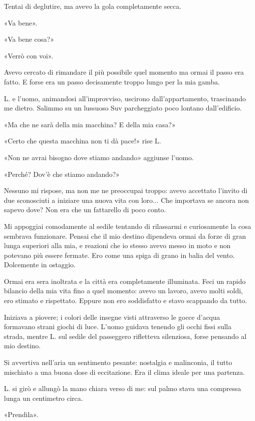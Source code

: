 \documentclass[a4paper,12pt]{book}
\begin{document}
Tentai di deglutire, ma avevo la gola completamente secca.

«Va bene».

«Va bene cosa?»

«Verrò con voi».

Avevo cercato di rimandare il più possibile quel momento ma ormai il passo era
fatto. E forse era un passo decisamente troppo lungo per la mia gamba.

L. e l'uomo, animandosi all'improvviso, uscirono dall'appartamento,
trascinando me dietro. Salimmo su un lussuoso Suv parcheggiato poco lontano
dall'edificio.

«Ma che ne sarà della mia macchina? E della mia casa?»

«Certo che questa macchina non ti dà pace!» rise L.

«Non ne avrai bisogno dove stiamo andando» aggiunse l'uomo.

«Perché? Dov'è che stiamo andando?»

Nessuno mi rispose, ma non me ne preoccupai troppo: avevo accettato l'invito
di due sconosciuti a iniziare una nuova vita con loro... Che importava se ancora
non sapevo dove? Non era che un fattarello di poco conto.

Mi appoggiai comodamente al sedile tentando di rilassarmi e curiosamente la
cosa sembrava funzionare. Pensai che il mio destino dipendeva ormai da forze di
gran lunga superiori alla mia, e reazioni che io stesso avevo messo in moto e
non potevano più essere fermate. Ero come una spiga di grano in balia del
vento. Dolcemente in ostaggio.

Ormai era sera inoltrata e la città era completamente illuminata. Feci un
rapido bilancio della mia vita fino a quel momento: avevo un lavoro, avevo molti
soldi, ero stimato e rispettato. Eppure non ero soddisfatto e stavo scappando
da tutto.

Iniziava a piovere; i colori delle insegne visti attraverso le gocce d'acqua
formavano strani giochi di luce. L'uomo guidava tenendo gli occhi fissi sulla
strada, mentre L. sul sedile del passeggero rifletteva silenziosa, forse
pensando al mio destino.

Si avvertiva nell'aria un sentimento pesante: nostalgia e malinconia, il tutto
mischiato a una buona dose di eccitazione. Era il clima ideale per una partenza.

L. si girò e allungò la mano chiara verso di me: sul palmo stava una compressa
lunga un centimetro circa.

«Prendila».
\end{document}
